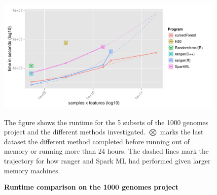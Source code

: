 \documentclass[10pt,letterpaper]{article}
\begin{document}
\begin{figure}[tbhp]
  \begin{adjustwidth}{-1.00in}{0in}
    \caption{\textbf{Runtime comparison on the 1000 genomes project}}
    \label{figure:1000genomes}
    \includegraphics[totalheight=8cm]{./figs/1000genomesRuntime.pdf}
    \begin{flushleft}
      The figure shows the runtime for the 5 subsets of the 1000 genomes project and the different methods investigated.
      $\bigotimes$ marks the last dataset the different method completed before running out of memory or running more than
      24 hours. The dashed lines mark the trajectory for how ranger and Spark ML had performed given larger memory machines.
    \end{flushleft}
  \end{adjustwidth}
\end{figure}


\iffalse
\end{document}
